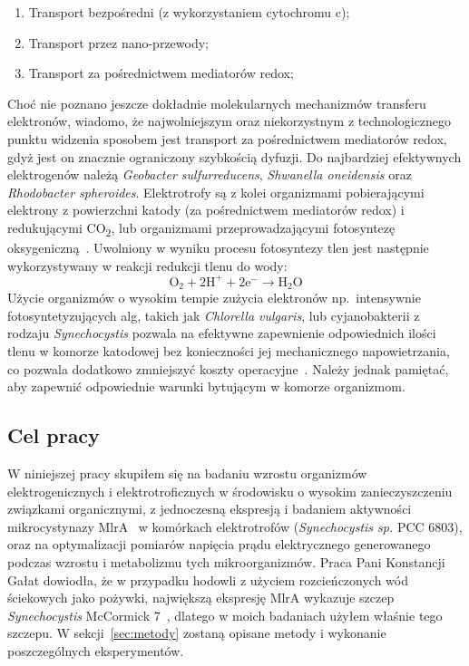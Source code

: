 \begin{enumerate}
    \item Transport bezpośredni (z wykorzystaniem cytochromu c);
    \item Transport przez nano-przewody;
    \item Transport za pośrednictwem mediatorów redox;
\end{enumerate}

Choć nie poznano jeszcze dokładnie molekularnych mechanizmów
transferu elektronów, wiadomo, że najwolniejszym oraz
niekorzystnym z technologicznego punktu widzenia sposobem jest
transport za pośrednictwem mediatorów redox, gdyż jest on znacznie
ograniczony szybkością dyfuzji.
Do najbardziej efektywnych elektrogenów należą
\textit{Geobacter sulfurreducens}, \textit{Shwanella oneidensis}
oraz \textit{Rhodobacter spheroides}.
Elektrotrofy są z kolei organizmami pobierającymi elektrony
z powierzchni katody (za pośrednictwem mediatorów redox)
i redukującymi CO\textsubscript{2}, lub organizmami przeprowadzającymi fotosyntezę
oksygeniczną~\cite{Santoro2017, Reddy2019}.
Uwolniony w wyniku procesu fotosyntezy tlen jest następnie
wykorzystywany w reakcji redukcji tlenu do wody:
\begin{equation}
    \label{eq:2}
    \mathrm{O_2 + 2H^+ + 2e^- \rightarrow H_2 O}
\end{equation}
Użycie organizmów o wysokim tempie zużycia elektronów np.\ intensywnie
fotosyntetyzujących alg, takich jak \textit{Chlorella vulgaris},
lub cyjanobakterii z rodzaju \textit{Synechocystis} pozwala na efektywne
zapewnienie odpowiednich ilości tlenu w komorze katodowej bez
konieczności jej mechanicznego napowietrzania, co pozwala dodatkowo
zmniejszyć koszty operacyjne~\cite{Reddy2019}.
Należy jednak pamiętać, aby zapewnić odpowiednie warunki
bytującym w komorze organizmom.

\subsection{Cel pracy}\label{subsec:badania}

W niniejszej pracy skupiłem się na badaniu wzrostu organizmów
elektrogenicznych i elektrotroficznych
w środowisku o wysokim zanieczyszczeniu związkami
organicznymi, z jednoczesną ekspresją i badaniem aktywności mikrocystynazy
MlrA~\cite{Dexter2018, Dexter2021} w komórkach elektrotrofów
(\textit{Synechocystis sp.} PCC 6803),
oraz na optymalizacji pomiarów napięcia prądu elektrycznego generowanego
podczas wzrostu i metabolizmu tych mikroorganizmów.
Praca Pani Konstancji Gałat dowiodła, że w przypadku
hodowli z użyciem rozcieńczonych wód ściekowych jako pożywki,
największą ekspresję MlrA wykazuje szczep
\textit{Synechocystis} McCormick 7~\cite{Galat2022},
dlatego w moich badaniach użyłem właśnie tego szczepu.
W sekcji~\ref{sec:metody} zostaną opisane metody i wykonanie
poszczególnych eksperymentów.